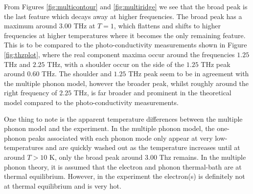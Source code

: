 From Figures \ref{fig:multicontour} and \ref{fig:multiridge} we see that the broad peak is the last feature which decays away at higher frequencies. The broad peak has a maximum around $3.00$ THz at $T = 1$, which flattens and shifts to higher frequencies at higher temperatures where it becomes the only remaining feature. This is to be compared to the photo-conductivity measurements shown in Figure \ref{fig:thzplot}, where the real component maxima occur around the frequencies $1.25$ THz and $2.25$ THz, with a shoulder occur on the side of the $1.25$ THz peak around $0.60$ THz. The shoulder and $1.25$ THz peak seem to be in agreement with the multiple phonon model, however the broader peak, whilst roughly around the right frequency of $2.25$ THz, is far broader and prominent in the theoretical model compared to the photo-conductivity measurements. 

One thing to note is the apparent temperature differences between the multiple phonon model and the experiment. In the multiple phonon model, the one-phonon peaks associated with each phonon mode only appear at very low-temperatures and are quickly washed out as the temperature increases until at around $T > 10$ K, only the broad peak around $3.00$ Thz remains. In the multiple phonon theory, it is assumed that the electron and phonon thermal-bath are at thermal equilibrium. However, in the experiment the electron(s) is definitely not at thermal equilibrium and is very hot.

